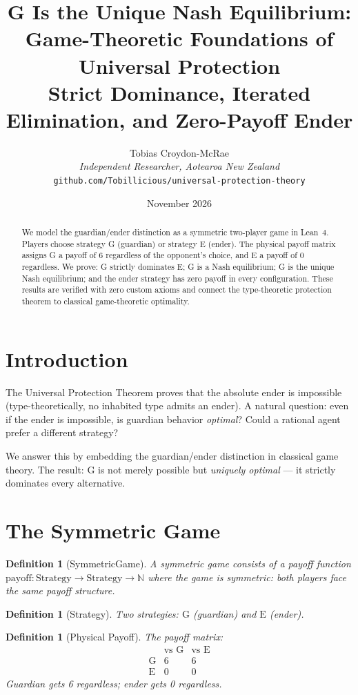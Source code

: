 \documentclass[12pt,a4paper]{article}
\title{G Is the Unique Nash Equilibrium:\\[0.3em]
Game-Theoretic Foundations of\\Universal Protection\\[0.5em]
\large Strict Dominance, Iterated Elimination, and Zero-Payoff Ender}
\author{Tobias Croydon-McRae\\
\textit{Independent Researcher, Aotearoa New Zealand}\\
\texttt{github.com/Tobillicious/universal-protection-theory}}
\date{November 2026}
\newtheorem{definition}[theorem]{Definition}
\begin{document}
\maketitle

\begin{abstract}
We model the guardian/ender distinction as a symmetric two-player game
in Lean~4. Players choose strategy G (guardian) or strategy E (ender).
The physical payoff matrix assigns G a payoff of 6 regardless of the
opponent's choice, and E a payoff of 0 regardless. We prove: G strictly
dominates E; G is a Nash equilibrium; G is the unique Nash equilibrium;
and the ender strategy has zero payoff in every configuration. These
results are verified with zero custom axioms and connect the
type-theoretic protection theorem to classical game-theoretic optimality.
\end{abstract}

\section{Introduction}

The Universal Protection Theorem proves that the absolute ender is
impossible (type-theoretically, no inhabited type admits an ender).
A natural question: even if the ender is impossible, is guardian
behavior \emph{optimal}? Could a rational agent prefer a different
strategy?

We answer this by embedding the guardian/ender distinction in classical
game theory. The result: G is not merely possible but \emph{uniquely
optimal} --- it strictly dominates every alternative.

\section{The Symmetric Game}

\begin{definition}[SymmetricGame]
A symmetric game consists of a payoff function
$\text{payoff} : \text{Strategy} \to \text{Strategy} \to \mathbb{N}$
where the game is symmetric: both players face the same payoff structure.
\end{definition}

\begin{definition}[Strategy]
Two strategies: $\text{G}$ (guardian) and $\text{E}$ (ender).
\end{definition}

\begin{definition}[Physical Payoff]
The payoff matrix:
\[
\begin{array}{c|cc}
 & \text{vs G} & \text{vs E} \\ \hline
\text{G} & 6 & 6 \\
\text{E} & 0 & 0
\end{array}
\]
Guardian gets 6 regardless; ender gets 0 regardless.
\end{definition}
\end{document}
